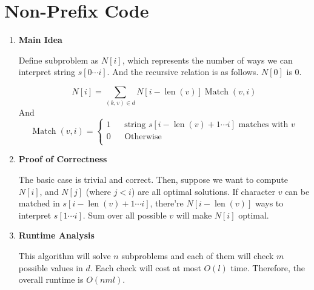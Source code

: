 \documentclass[11pt]{article}
\newenvironment{qparts}{\begin{enumerate}[{(}a{)}]}{\end{enumerate}}
\begin{document}
\section{Non-Prefix Code}
\begin{qparts}
	\item \textbf{Main Idea}
	
	Define subproblem as $N[i]$, which represents the number of ways we can interpret string $s[0 \cdots i]$. And the recursive relation is as follows. $N[0]$ is 0.
	
	\[
		N[i] = \sum_{(k, v) \in d} N[i - \operatorname{len}(v)] \operatorname{Match}(v, i)
	\]
	And
	\[ \operatorname{Match}(v, i) = 
	\left\{
		\begin{array}{rcl}
			1     &      & \text{string } s[i - \operatorname{len}(v) + 1 \cdots i] \text{ matches with } v  \\
			0      &      & \text{Otherwise}  \\
		\end{array}
	\right.
	\]
	\item \textbf{Proof of Correctness}
	
	The basic case is trivial and correct. Then, suppose we want to compute $N[i]$, and $N[j]$ (where $j<i$) are all optimal solutions. If character $v$ can be matched in $s[i - \operatorname{len}(v) + 1 \cdots i]$, there're $N[i - \operatorname{len}(v)]$ ways to interpret $s[1 \cdots i]$. Sum over all possible $v$ will make $N[i]$ optimal.
	
	
	\item \textbf{Runtime Analysis}
	
	This algorithm will solve $n$ subproblems and each of them will check $m$ possible values in $d$. Each check will cost at most $O(l)$ time. Therefore, the overall runtime is $O(nml)$.
	

\end{qparts}


\newpage
\end{document}
